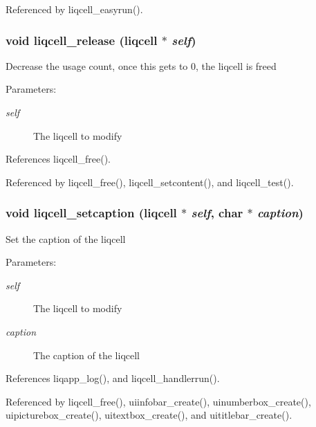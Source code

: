 Referenced by liqcell\_\-easyrun().
\subsubsection[{liqcell\_\-release}]{\setlength{\rightskip}{0pt plus 5cm}void liqcell\_\-release (liqcell $\ast$ {\em self})}\label{d5/da2/liqcell_8c_211b41b1487a3daf16432b93459f58d6}


Decrease the usage count, once this gets to 0, the liqcell is freed \begin{Desc}
\item[Parameters:]
\begin{description}
\item[{\em self}]The liqcell to modify \end{description}
\end{Desc}


References liqcell\_\-free().

Referenced by liqcell\_\-free(), liqcell\_\-setcontent(), and liqcell\_\-test().
\subsubsection[{liqcell\_\-setcaption}]{\setlength{\rightskip}{0pt plus 5cm}void liqcell\_\-setcaption (liqcell $\ast$ {\em self}, \/  char $\ast$ {\em caption})}\label{d5/da2/liqcell_8c_df7b143fdd148d3119bf0b5aa5f7cb16}


Set the caption of the liqcell \begin{Desc}
\item[Parameters:]
\begin{description}
\item[{\em self}]The liqcell to modify \item[{\em caption}]The caption of the liqcell \end{description}
\end{Desc}


References liqapp\_\-log(), and liqcell\_\-handlerrun().

Referenced by liqcell\_\-free(), uiinfobar\_\-create(), uinumberbox\_\-create(), uipicturebox\_\-create(), uitextbox\_\-create(), and uititlebar\_\-create().

